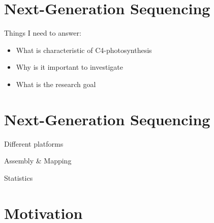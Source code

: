 \section{Next-Generation Sequencing}

Things I need to answer:
\begin{itemize}
	\item What is characteristic of C4-photosynthesis
	\item Why is it important to investigate
	\item What is the research goal
\end{itemize}
\section{Next-Generation Sequencing}
	\item Different platforms
	\item Assembly \& Mapping
	\item Statistics
\section{Motivation}
